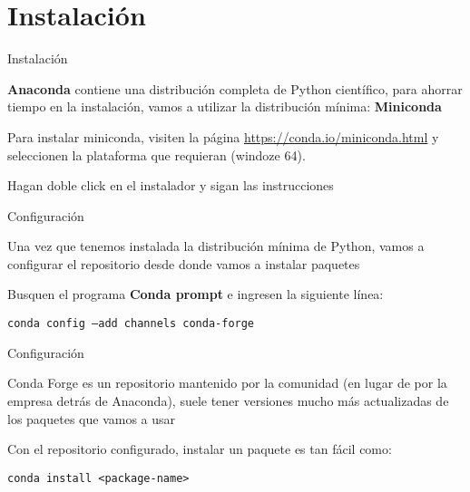 \documentclass[10pt]{beamer}
\newcommand{\chref}[2]{
  \href{#1}{{\usebeamercolor[bg]{Feather}#2}}
}
\begin{document}
\section{Instalación}

\begin{frame}{Instalación}

  \begin{block}{}
    \textbf{Anaconda} contiene una distribución completa de Python científico,
    para ahorrar tiempo en la instalación, vamos a utilizar la distribución
    mínima: \textbf{Miniconda}
  \end{block}\pause

  \begin{block}{}
    Para instalar miniconda, visiten la página \chref{https://conda.io/miniconda.html}{https://conda.io/miniconda.html} y seleccionen la plataforma que requieran (windoze 64).

    Hagan doble click en el instalador y sigan las instrucciones
  \end{block}

\end{frame}


\begin{frame}{Configuración}

  \begin{block}{}
    Una vez que tenemos instalada la distribución mínima de Python, vamos a configurar
    el repositorio desde donde vamos a instalar paquetes
  \end{block}\pause

  \begin{block}{}
    Busquen el programa \textbf{Conda prompt} e ingresen la siguiente línea:

    {\tt conda config --add channels conda-forge}
  \end{block}

\end{frame}

\begin{frame}{Configuración}

  \begin{block}{}
    Conda Forge es un repositorio mantenido por la comunidad
    (en lugar de por la empresa detrás de Anaconda), suele tener versiones
    mucho más actualizadas de los paquetes que vamos a usar
  \end{block}\pause

  \begin{block}{}
    Con el repositorio configurado, instalar un paquete es tan fácil como:

    {\tt conda install <package-name>}
  \end{block}

\end{frame}
\end{document}

